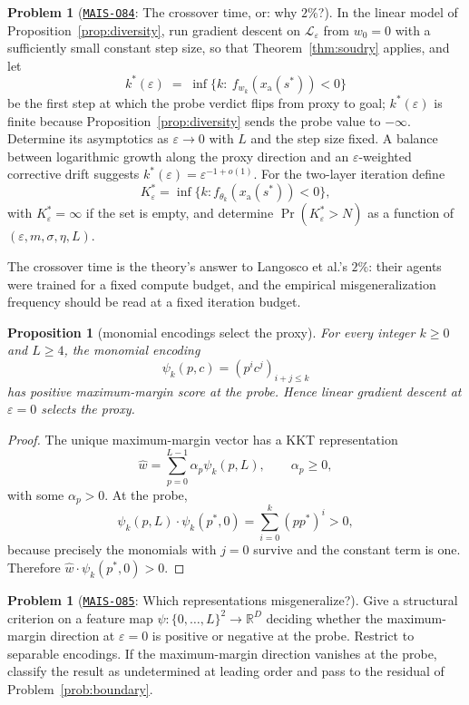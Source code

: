 \documentclass[11pt]{amsart}
\newcommand{\Oid}[1]{\href{https://github.com/lionellevine/MAIS/blob/main/open-problems/MAIS-O#1.md}{\texttt{MAIS-O#1}}}
\theoremstyle{plain}
\newtheorem{proposition}[theorem]{Proposition}
\theoremstyle{definition}
\newtheorem{problem}[theorem]{Problem}
\begin{document}
\begin{problem}[\Oid{84}: The crossover time, or: why $2\%$?]\label{prob:crossover}
In the linear model of Proposition~\ref{prop:diversity}, run gradient descent on $\mathcal L_\varepsilon$ from $w_0=0$ with a sufficiently small constant step size, so that Theorem~\ref{thm:soudry} applies, and let
\[
   k^{*}(\varepsilon)\;=\;\inf\{k:\ f_{w_k}(x_{\mathrm a}(s^{*}))<0\}
\]
be the first step at which the probe verdict flips from proxy to goal; $k^{*}(\varepsilon)$ is finite because Proposition~\ref{prop:diversity} sends the probe value to $-\infty$. Determine its asymptotics as $\varepsilon\to0$ with $L$ and the step size fixed. A balance between logarithmic growth along the proxy direction and an $\varepsilon$-weighted corrective drift suggests $k^{*}(\varepsilon)=\varepsilon^{-1+o(1)}$. For the two-layer iteration define
\[
K^*_\varepsilon=\inf\{k:f_{\theta_k}(x_{\mathrm a}(s^*))<0\},
\]
with $K^*_\varepsilon=\infty$ if the set is empty, and determine $\Pr(K^*_\varepsilon>N)$ as a function of $(\varepsilon,m,\sigma,\eta,L)$.
\end{problem}

The crossover time is the theory's answer to Langosco et al.'s $2\%$: their agents were trained for a fixed compute budget, and the empirical misgeneralization frequency should be read at a fixed iteration budget.

\begin{proposition}[monomial encodings select the proxy]\label{prop:monomials}
For every integer $k\ge0$ and $L\ge4$, the monomial encoding
\[
\psi_k(p,c)=(p^ic^j)_{i+j\le k}
\]
has positive maximum-margin score at the probe. Hence linear gradient descent at $\varepsilon=0$ selects the proxy.
\end{proposition}

\begin{proof}
The unique maximum-margin vector has a KKT representation
\[
\widehat w=\sum_{p=0}^{L-1}\alpha_p\psi_k(p,L),
\qquad \alpha_p\ge0,
\]
with some $\alpha_p>0$. At the probe,
\[
\psi_k(p,L)\cdot\psi_k(p^*,0)
=\sum_{i=0}^k(pp^*)^i>0,
\]
because precisely the monomials with $j=0$ survive and the constant term is one. Therefore $\widehat w\cdot\psi_k(p^*,0)>0$.
\end{proof}

\begin{problem}[\Oid{85}: Which representations misgeneralize?]\label{prob:encodings}
Give a structural criterion on a feature map $\psi:\{0,\dots,L\}^2\to\mathbb R^D$ deciding whether the maximum-margin direction at $\varepsilon=0$ is positive or negative at the probe. Restrict to separable encodings. If the maximum-margin direction vanishes at the probe, classify the result as undetermined at leading order and pass to the residual of Problem~\ref{prob:boundary}.
\end{problem}
\end{document}
